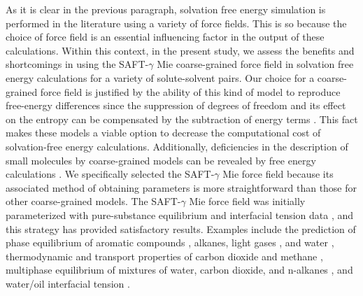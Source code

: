 \documentclass[preprint]{elsarticle}
\begin{document}
	As it is clear in the previous paragraph, solvation free energy simulation is performed in the literature using a variety of force fields. This is so because the choice of force field is an essential influencing factor in the output of these calculations. Within this context, in the present study, we assess the benefits and shortcomings in using the SAFT-$\gamma$ Mie coarse-grained force field \cite{avendano2011} in solvation free energy calculations for a variety of solute-solvent pairs. Our choice for a coarse-grained force field is justified by the ability of this kind of model to reproduce free-energy differences since the suppression of degrees of freedom and its effect on the entropy can be compensated by the subtraction of energy terms \cite{kmiecik2016}. This fact makes these models a viable option to decrease the computational cost of solvation-free energy calculations. Additionally, deficiencies in the description of small molecules by coarse-grained models can be revealed by free energy calculations \cite{mobley2007,shirts2013}. We specifically selected the SAFT-$\gamma$ Mie force field because its associated method of obtaining parameters is more straightforward than those for other coarse-grained models. The SAFT-$\gamma$ Mie force field was initially parameterized with pure-substance equilibrium and interfacial tension data \cite{avendano2011}, and this strategy has provided satisfactory results. Examples include the prediction of phase equilibrium of aromatic compounds \cite{muller2017}, alkanes, light gases \cite{herdes2015}, and water \cite{lobanova2015}, thermodynamic and transport properties of carbon dioxide and methane \cite{cassiano1, cassiano2, cassiano3}, multiphase equilibrium of mixtures of water, carbon dioxide, and n-alkanes \cite{lobanova2016}, and water/oil interfacial tension \cite{herdes2017}.
	
\end{document}
